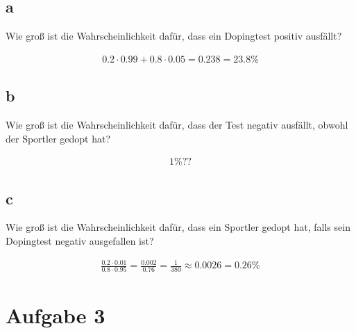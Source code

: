\begin{center}
\end{center}

\subsection{a}

Wie groß ist die Wahrscheinlichkeit dafür, dass ein Dopingtest positiv
ausfällt?

\begin{align*}
    0.2 \cdot 0.99 + 0.8 \cdot 0.05 = 0.238 = 23.8\%
\end{align*}

\subsection{b}

Wie groß ist die Wahrscheinlichkeit dafür, dass der Test negativ ausfällt,
obwohl der Sportler gedopt hat?

\begin{align*}
    1\%??
\end{align*}

\subsection{c}

Wie groß ist die Wahrscheinlichkeit dafür, dass ein Sportler gedopt hat, falls
sein Dopingtest negativ ausgefallen ist?

\begin{align*}
    \frac{0.2 \cdot 0.01}{0.8 \cdot 0.95} = \frac{0.002}{0.76} = \frac{1}{380} \approx 0.0026 = 0.26\%
\end{align*}

\section{Aufgabe 3}

